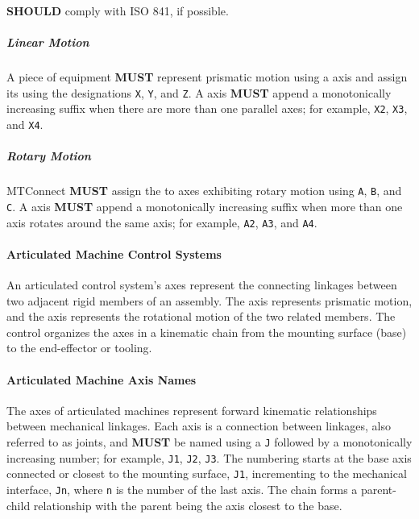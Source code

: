   \textbf{SHOULD} comply with ISO 841, if possible.

\subparagraph{Linear Motion}
\label{sec:Linear Motion}

A piece of equipment \textbf{MUST} represent prismatic motion using a  axis  and assign its  using the designations \texttt{X}, \texttt{Y}, and \texttt{Z}. A  axis  \textbf{MUST} append a monotonically increasing suffix when there are more than one parallel axes; for example, \texttt{X2}, \texttt{X3}, and \texttt{X4}. 

\subparagraph{Rotary Motion}
\label{sec:Rotary Motion}

MTConnect \textbf{MUST} assign the  to  axes exhibiting rotary motion using \texttt{A}, \texttt{B}, and \texttt{C}. A  axis  \textbf{MUST} append a monotonically increasing suffix when more than one  axis rotates around the same  axis; for example, \texttt{A2}, \texttt{A3}, and \texttt{A4}. 

\paragraph{Articulated Machine Control Systems}
\label{sec:Articulated Machine Control Systems}

An articulated control system's axes represent the connecting linkages between two adjacent rigid members of an assembly. The  axis represents prismatic motion, and the  axis represents the rotational motion of the two related members. The control organizes the axes in a kinematic chain from the mounting surface (base) to the end-effector or tooling.

\paragraph{Articulated Machine Axis Names}
\label{sec:Articulated Machine Axis Names}

The axes of articulated machines represent forward kinematic relationships between mechanical linkages. Each axis is a connection between linkages, also referred to as joints, and \textbf{MUST} be named using a \texttt{J} followed by a monotonically increasing number; for example, \texttt{J1}, \texttt{J2}, \texttt{J3}.  The numbering starts at the base axis connected or closest to the mounting surface, \texttt{J1}, incrementing to the mechanical interface, \texttt{Jn}, where \texttt{n} is the number of the last axis. The chain forms a parent-child relationship with the parent being the axis closest to the base.


